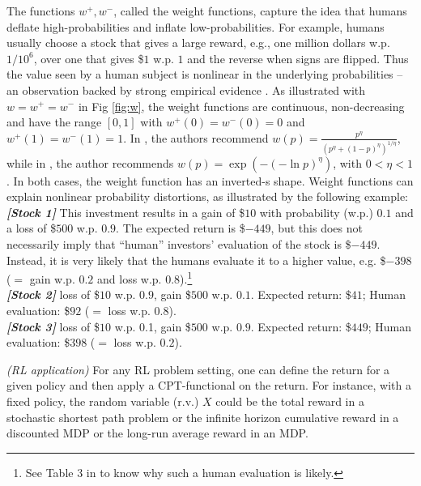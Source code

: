 The functions $w^+, w^-$, called the weight functions, capture the idea that humans deflate high-probabilities and inflate low-probabilities.
For example, humans usually choose a stock that gives a large reward, e.g., 
one million dollars w.p. $1/10^6$, over one that gives \$$1$ w.p. $1$ and the reverse when signs are flipped. 
Thus the value seen by a human subject is nonlinear in the underlying probabilities -- an observation backed by strong empirical evidence \cite{tversky1992advances,Barberis:2012vs}.  
As illustrated with $w=w^+=w^-$ in Fig \ref{fig:w}, the weight functions are continuous, non-decreasing and  have the range $[0,1]$ with $w^+(0)=w^-(0)=0$ and $w^+(1)=w^-(1)=1$. 
In \cite{tversky1992advances}, the authors recommend $w(p) = \frac{p^{\eta}}{{(p^{\eta}+ (1-p)^{\eta})}^{1/\eta}}$, while in \cite{prelec1998probability}, the author recommends $w(p) = \exp(-(-\ln p)^\eta)$, with $0 < \eta <1$. In both cases, the weight function has an inverted-s shape.
Weight functions can explain nonlinear probability distortions, as illustrated by the following example: \\
\textit{\textbf{[Stock 1]}} This investment results in a gain of \$$10$ with probability (w.p.) $0.1$ and a loss of \$$500$ w.p. $0.9$. The expected return is \$$-449$, but this does not necessarily imply that ``human'' investors' evaluation of the stock is \$$-449$. Instead, it is very likely that the humans evaluate it to a higher value, e.g. \$$-398$ ($=$ gain w.p. $0.2$ and loss w.p. $0.8$).\footnote{See Table 3 in \cite{tversky1992advances} to know why such a human evaluation is likely.}\\
\textit{\textbf{[Stock 2]}} loss of \$$10$ w.p. $0.9$, gain \$$500$ w.p. $0.1$. Expected return: \$$41$; Human evaluation: \$$92$ ($=$ loss w.p. $0.8$).\\
\textit{\textbf{[Stock 3]}} loss of \$$10$ w.p. 0.1, gain \$$500$ w.p. $0.9$. Expected return: \$$449$; Human evaluation: \$$398$ ($=$ loss w.p. $0.2$). 
\fi



\begin{remark}\textit{(RL application)}
For any RL problem setting, one can define the return for a given policy and then apply a CPT-functional on the return. For instance, with a fixed policy, the random variable (r.v.) $X$ could be the total reward in a stochastic shortest path problem or the infinite horizon cumulative reward in a discounted MDP or the long-run average reward in an MDP.
\end{remark}


